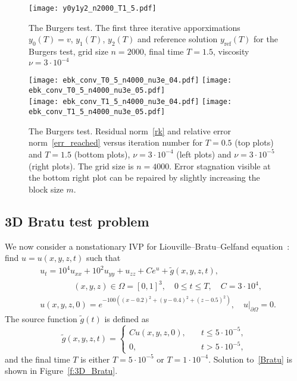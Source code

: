 \documentclass[sn-aps]{sn-jnl}
\theoremstyle{thmstyleone}%
\theoremstyle{thmstyletwo}%
\theoremstyle{thmstylethree}%
\newcommand{\leqs}{\leqslant}
\begin{document}
\begin{figure}  
\centerline{\texttt{[image: y0y1y2\_n2000\_T1\_5.pdf]}}
\caption{The Burgers test.
The first three iterative apporximations $y_0(T)=v$, $y_1(T)$, $y_2(T)$
and reference solution $y_{\mathrm{ref}}(T)$ for the Burgers test, 
grid size $n=2000$, final time $T=1.5$, viscosity $\nu=3\cdot 10^{-4}$}
\label{f:1D_Brgrs}
\end{figure}

\begin{figure}
\texttt{[image: ebk\_conv\_T0\_5\_n4000\_nu3e\_04.pdf]}%
\texttt{[image: ebk\_conv\_T0\_5\_n4000\_nu3e\_05.pdf]}\\[2ex]
\texttt{[image: ebk\_conv\_T1\_5\_n4000\_nu3e\_04.pdf]}%
\texttt{[image: ebk\_conv\_T1\_5\_n4000\_nu3e\_05.pdf]}
\caption{The Burgers test.
Residual norm~\eqref{rk} and relative error norm~\eqref{err_reached} versus 
iteration number for $T=0.5$ (top plots) and $T=1.5$ (bottom plots),
$\nu=3\cdot 10^{-4}$ (left plots) and $\nu=3\cdot 10^{-5}$ (right plots).
The grid size is $n=4000$. Error stagnation visible at the bottom right plot
can be repaired by slightly increasing the block size $m$.}
\label{f:conv}  
\end{figure}

\subsection{3D Bratu test problem}
\label{s:num_exp3D}
We now consider a nonstationary IVP for Liouville--Bratu--Gelfand equation~\cite{JacobsenSchmitt2002}:
find $u=u(x,y,z,t)$ such that
\begin{equation}
\label{Bratu}
\begin{aligned}
& u_t = 10^4u_{xx} + 10^2u_{yy} + u_{zz} + Ce^u + \tilde{g}(x,y,z,t), 
\\ 
& \qquad\qquad (x,y,z)\in\Omega=[0,1]^3,  \quad 0\leqs t\leqs T, \quad C=3\cdot 10^4,
\\
& u(x,y,z,0) = e^{-100\left( (x-0.2)^2 + (y-0.4)^2 + (z-0.5)^2 \right)},\quad
u\bigl|_{\partial\Omega}=0.
\end{aligned}
\end{equation}
The source function $\tilde{g}(t)$ is defined as
$$
\tilde{g}(x,y,z,t) = 
 \begin{cases}
    C u(x,y,z,0), \quad & t\leqslant 5\cdot 10^{-5},\\
    0,            \quad & t>         5\cdot 10^{-5},
  \end{cases}
$$
and the final time $T$ is either $T=5\cdot 10^{-5}$ or $T=1\cdot 10^{-4}$.
Solution to~\eqref{Bratu} is shown in Figure~\ref{f:3D_Bratu}.
\end{document}
